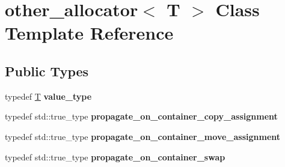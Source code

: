 \hypertarget{classother__allocator}{}\section{other\+\_\+allocator$<$ T $>$ Class Template Reference}
\label{classother__allocator}
\subsection*{Public Types}
\begin{DoxyCompactItemize}
\item 
\mbox{\label{classother__allocator_afbe7e4df8811156d4b5a1b9393b98cdd}} 
typedef \mbox{\hyperlink{struct_t}{T}} {\bfseries value\+\_\+type}
\item 
\mbox{\label{classother__allocator_a43859fd256f3e10303e3341f3f3006e6}} 
typedef std\+::true\+\_\+type {\bfseries propagate\+\_\+on\+\_\+container\+\_\+copy\+\_\+assignment}
\item 
\mbox{\label{classother__allocator_a72efe34ec4ac39d087856a8c0a1e7dfc}} 
typedef std\+::true\+\_\+type {\bfseries propagate\+\_\+on\+\_\+container\+\_\+move\+\_\+assignment}
\item 
\mbox{\label{classother__allocator_a28aa0a7b25b65bac787de37a4c847219}} 
typedef std\+::true\+\_\+type {\bfseries propagate\+\_\+on\+\_\+container\+\_\+swap}
\end{DoxyCompactItemize}
